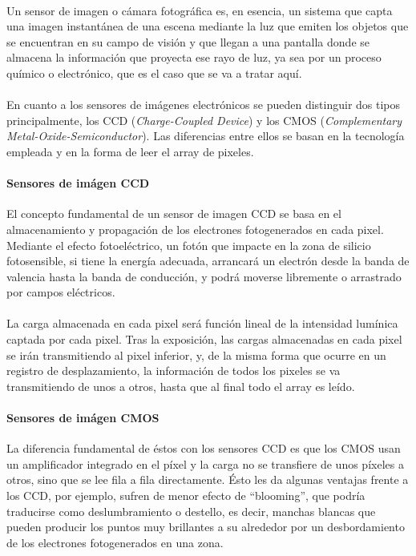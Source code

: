 \paragraph{}
Un sensor de imagen o cámara fotográfica es, en esencia, un sistema que capta
una imagen instantánea de una escena mediante la luz que emiten los objetos que
se encuentran en su campo de visión y que llegan a una pantalla donde se almacena
la información que proyecta ese rayo de luz, ya sea por un proceso químico
o electrónico, que es el caso que se va a tratar aquí.

\paragraph{}
En cuanto a los sensores de imágenes electrónicos se pueden distinguir dos tipos
principalmente, los CCD (\textit{Charge-Coupled Device}) y los CMOS
(\textit{Complementary Metal-Oxide-Semiconductor}). Las diferencias entre ellos
se basan en la tecnología empleada y en la forma de leer el array de pixeles.

\paragraph{Sensores de imágen CCD}
El concepto fundamental de un sensor de imagen CCD se basa en el almacenamiento
y propagación de los electrones fotogenerados en cada pixel. Mediante el efecto
fotoeléctrico, un fotón que impacte en la zona de silicio fotosensible, si tiene
la energía adecuada, arrancará un electrón desde la banda de valencia hasta la
banda de conducción, y podrá moverse libremente o arrastrado por campos eléctricos.

\paragraph{}
La carga almacenada en cada pixel será función lineal de la intensidad lumínica
captada por cada pixel. Tras la exposición, las cargas almacenadas en cada pixel
se irán transmitiendo al pixel inferior, y, de la misma forma que ocurre en un
registro de desplazamiento, la información de todos los pixeles se va transmitiendo
de unos a otros, hasta que al final todo el array es leído.\cite{Nakamura2005:IS_and_SP_for_DSC}

\paragraph{Sensores de imágen CMOS}
La diferencia fundamental de éstos con los sensores CCD es que los CMOS usan un
amplificador integrado en el píxel y la carga no se transfiere de unos píxeles
a otros, sino que se lee fila a fila directamente. Ésto les da algunas ventajas
frente a los CCD, por ejemplo, sufren de menor efecto de ``blooming'', que podría
traducirse como deslumbramiento o destello, es decir, manchas blancas que pueden
producir los puntos muy brillantes a su alrededor por un desbordamiento de los
electrones fotogenerados en una zona.

